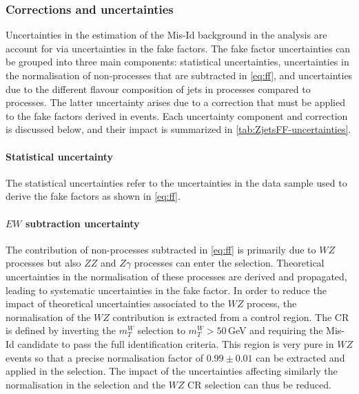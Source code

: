 \subsubsection{Corrections and uncertainties}
Uncertainties in the estimation of the Mis-Id background in the analysis are account for via uncertainties in the fake factors.
The fake factor uncertainties can be grouped into three main components: statistical uncertainties, uncertainties in the normalisation of non-\Zjets processes that are subtracted in \cref{eq:ff}, and uncertainties due to the different flavour composition of jets in \Zjets processes compared to \Wjets processes. 
The latter uncertainty arises due to a correction that must be applied to the fake factors derived in \Zjets events. 
Each uncertainty component and correction is discussed below, and their impact is summarized in \cref{tab:ZjetsFF-uncertainties}.


\paragraph{Statistical uncertainty} 
The statistical uncertainties refer to the uncertainties in the data sample used to derive the fake factors as shown in \cref{eq:ff}. 

\paragraph{$EW$ subtraction uncertainty}
The contribution of non-\Zjets processes subtracted in \cref{eq:ff} is primarily due to $WZ$ processes but also $ZZ$ and $Z\gamma$ processes can enter the \Zjets selection. 
Theoretical uncertainties in the normalisation of these processes are derived and propagated, leading to systematic uncertainties in the fake factor. 
In order to reduce the impact of theoretical uncertainties associated to the $WZ$ process, the normalisation of the $WZ$ contribution is extracted from a control region. The CR is defined by inverting the $m_T^W$ selection to $m_T^W > 50\,$GeV and requiring the Mis-Id candidate to pass the full identification criteria. This region is very pure in $WZ$ events so that a precise normalisation factor of $0.99 \pm 0.01$ can be extracted and applied in the \Zjets selection. The impact of the uncertainties affecting similarly the normalisation in the \Zjets selection and the $WZ$ CR selection can thus be reduced.



